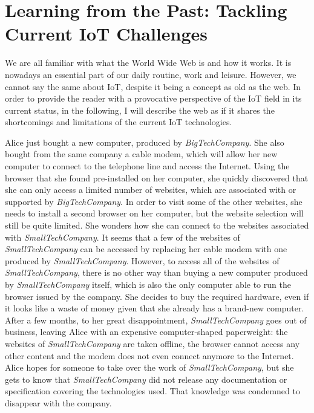 \section{Learning from the Past: Tackling Current IoT Challenges}

We are all familiar with what the World Wide Web is and how it works. It is nowadays an essential part of our daily routine, work and leisure. However, we cannot say the same about IoT, despite it being a concept as old as the web. In order to provide the reader with a provocative perspective of the IoT field in its current status, in the following, I will describe the web as if it shares the shortcomings and limitations of the current IoT technologies.

\begin{framed}
Alice just bought a new computer, produced by \textit{BigTechCompany}. She also bought from the same company a cable modem, which will allow her new computer to connect to the telephone line and access the Internet. Using the browser that she found pre-installed on her computer, she quickly discovered that she can only access a limited number of websites, which are associated with or supported by \textit{BigTechCompany}. In order to visit some of the other websites, she needs to install a second browser on her computer, but the website selection will still be quite limited. She wonders how she can connect to the websites associated with \textit{SmallTechCompany}. It seems that a few of the websites of \textit{SmallTechCompany} can be accessed by replacing her cable modem with one produced by \textit{SmallTechCompany}. However, to access all of the websites of \textit{SmallTechCompany}, there is no other way than buying a new computer produced by \textit{SmallTechCompany} itself, which is also the only computer able to run the browser issued by the company.
She decides to buy the required hardware, even if it looks like a waste of money given that she already has a brand-new computer. After a few months, to her great disappointment, \textit{SmallTechCompany} goes out of business, leaving Alice with an expensive computer-shaped paperweight: the websites of \textit{SmallTechCompany} are taken offline, the browser cannot access any other content and the modem does not even connect anymore to the Internet. Alice hopes for someone to take over the work of \textit{SmallTechCompany}, but she gets to know that \textit{SmallTechCompany} did not release any documentation or specification covering the technologies used. That knowledge was condemned to disappear with the company.
\end{framed}

